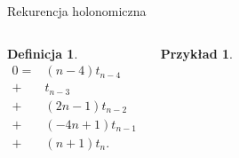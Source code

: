 \documentclass[final]{beamer}
\theoremstyle{bluetheorem}
\theoremstyle{bluetheorem}
\newtheorem{mydefinition}[mytheorem]{Definicja}
\theoremstyle{greentheorem}
\newtheorem{myexample}[mytheorem]{Przykład}
\newcommand{\includeinlinescaledsvg}[3]{\begin{minipage}{#1\textwidth}\begin{center}\end{center}\end{minipage}}
\begin{document}

\begin{frame}{Rekurencja holonomiczna}
    \begin{columns}
        \begin{mydefinition}
            \[\begin{array}{rl}
                    0 =& (n - 4) t_{n - 4}\\
                    +& t_{n - 3}\\
                    +& (2 n - 1) t_{n - 2}\\
                    +& (-4 n + 1) t_{n - 1}\\
                    +& (n + 1) t_{n}.
            \end{array}\]
        \end{mydefinition}

        \begin{myexample}
            \begin{center}
                \includeinlinescaledsvg{1}{0.6}{lambda__tree_structure__deBruijn_002_no_pointers}
            \end{center}
        \end{myexample}
    \end{columns}
\end{frame}
\end{document}
